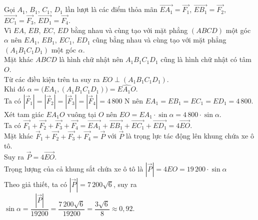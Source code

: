 \begin{bt}
{\begin{center}
\begin{tikzpicture}[scale=1,font=\footnotesize,line join=round,line cap=round,>=stealth]
			\end{tikzpicture}
		\end{center} 
		Gọi $A_1$, $B_1$, $C_1$, $D_1$ lần lượt là các điểm thỏa mãn $\overrightarrow{EA_1}=\overrightarrow{F_1}$, $\overrightarrow{EB_1}=\overrightarrow{F_2}$, $\overrightarrow{EC_1}=\overrightarrow{F_3}$, $\overrightarrow{ED_1}=\overrightarrow{F_4}$.\\
		Vì $EA$, $EB$, $EC$, $ED$ bằng nhau và cùng tạo với mặt phẳng $(ABCD)$ một góc $\alpha$ nên $EA_1$, $EB_1$, $EC_1$, $ED_1$ cũng bằng nhau và cùng tạo với mặt phẳng $\left(A_1B_1C_1D_1\right)$ một góc $\alpha$.\\
		Mặt khác $ABCD$ là hình chữ nhật nên $A_1B_1C_1D_1$ cũng là hình chữ nhật có tâm $O$.\\
		Từ các điều kiện trên ta suy ra $EO\perp\left(A_1B_1C_1D_1\right)$. \\
		Khi đó $\alpha=\big(EA_1,\left(A_1B_1C_1D_1\right)\big)=\widehat{EA_1O}$.\\
		Ta có $\left|\overrightarrow{F}_1\right|=\left|\overrightarrow{F}_2\right|=\left|\overrightarrow{F}_3\right|=\left|\overrightarrow{F}_4\right|=4\,800$ N nên $EA_1=EB_1=EC_1=ED_1=4\,800$.\\
		Xét tam giác $EA_1O$ vuông tại $O$ nên $EO=EA_1\cdot \sin \alpha=4\,800\cdot \sin \alpha$.\\
		Ta có $\overrightarrow{F_1}+\overrightarrow{F_2}+\overrightarrow{F_3}+\overrightarrow{F_4}=\overrightarrow{EA_1}+\overrightarrow{EB_1}+\overrightarrow{EC_1}+\overrightarrow{ED_1}=4\overrightarrow{EO}$.\\
		Mặt khác $\overrightarrow{F}_1+\overrightarrow{F_2}+\overrightarrow{F_3}+\overrightarrow{F_4}=\overrightarrow{P}$ với $\overrightarrow{P}$ là trọng lực tác động lên khung chứa xe ô tô.\\
		Suy ra $\overrightarrow{P}=4\overrightarrow{EO}$.\\
		Trọng lượng của cả khung sắt chứa xe ô tô là $\left|\overrightarrow{P}\right|=4EO=19\,200\cdot \sin \alpha$\\
		Theo giả thiết, ta có $\left|\overrightarrow{P}\right|=7\,200\sqrt{6}$, suy ra $\sin \alpha=\dfrac{\left|\overrightarrow{P}\right|}{19200}=\dfrac{7\,200\sqrt{6}}{19200}=\dfrac{3\sqrt{6}}{8} \approx 0{,}92$.
	}
\end{bt}

